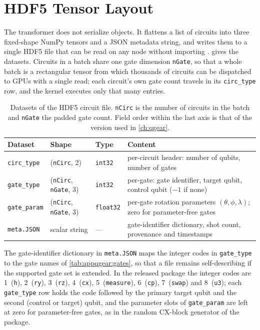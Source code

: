 \section{HDF5 Tensor Layout}\label{sec:appqgear:hdf5}

The transformer does not serialize \qiskit{} objects. It flattens a list of circuits into three fixed-shape NumPy tensors and a JSON metadata string, and writes them to a single HDF5 file that can be read on any node without importing \qiskit{}.  gives the datasets. Circuits in a batch share one gate dimension \texttt{nGate}, so that a whole batch is a rectangular tensor from which thousands of circuits can be dispatched to GPUs with a single read; each circuit's own gate count travels in its \texttt{circ\_type} row, and the kernel executes only that many entries.

\begin{table}[htbp]
\caption{Datasets of the \qgear{} HDF5 circuit file. \texttt{nCirc} is the number of circuits in the batch and \texttt{nGate} the padded gate count. Field order within the last axis is that of the version used in \cref{ch:qgear}.}
\label{tab:appqgear:hdf5}
\centering
\begingroup\singlespacing\footnotesize
\begin{tabular}{@{}lll>{\raggedright\arraybackslash}p{6.2cm}@{}}
\toprule
Dataset & Shape & Type & Content \\
\midrule
\texttt{circ\_type} & (\texttt{nCirc}, 2) & \texttt{int32} & per-circuit header: number of qubits, number of gates \\
\texttt{gate\_type} & (\texttt{nCirc}, \texttt{nGate}, 3) & \texttt{int32} & per-gate: gate identifier, target qubit, control qubit ($-1$ if none) \\
\texttt{gate\_param} & (\texttt{nCirc}, \texttt{nGate}, 3) & \texttt{float32} & per-gate rotation parameters $(\theta,\phi,\lambda)$; zero for parameter-free gates \\
\texttt{meta.JSON} & scalar string & --- & gate-identifier dictionary, shot count, provenance and timestamps \\
\bottomrule
\end{tabular}
\endgroup
\end{table}

The gate-identifier dictionary in \texttt{meta.JSON} maps the integer codes in \texttt{gate\_type} to the gate names of \cref{tab:appqgear:gates}, so that a file remains self-describing if the supported gate set is extended. In the released package the integer codes are 1~(\texttt{h}), 2~(\texttt{ry}), 3~(\texttt{rz}), 4~(\texttt{cx}), 5~(\texttt{measure}), 6~(\texttt{cp}), 7~(\texttt{swap}) and 8~(\texttt{u3}); each \texttt{gate\_type} row holds the code followed by the primary target qubit and the second (control or target) qubit, and the parameter slots of \texttt{gate\_param} are left at zero for parameter-free gates, as in the random CX-block generator of the package.


